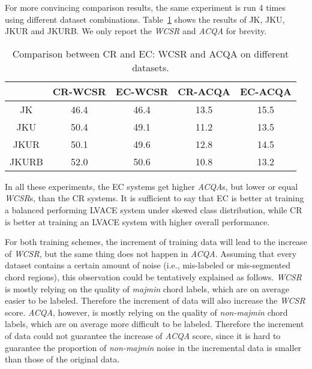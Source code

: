 For more convincing comparison results, the same experiment is run 4 times using different dataset combinations. Table~\ref{tab:4-datasize-ns} shows the results of JK, JKU, JKUR and JKURB. We only report the \textit{WCSR} and \textit{ACQA} for brevity.
\begin{table}[htb]
	\caption{Comparison between CR and EC: WCSR and ACQA on different datasets.}
	\centering
	\scriptsize
	\begin{tabular}{|c|c|c|c|c|} \hline
		& CR-WCSR & EC-WCSR & CR-ACQA & EC-ACQA \\ \hline
		JK & 46.4 & 46.4 & 13.5 & 15.5 \\ \hline
		JKU & 50.4 & 49.1 & 11.2 & 13.5 \\ \hline
		JKUR & 50.1 & 49.6 & 12.8 & 14.5 \\ \hline
		JKURB & 52.0 & 50.6 & 10.8 & 13.2 \\ \hline
	\end{tabular}
	\label{tab:4-datasize-ns}
\end{table}

In all these experiments, the EC systems get higher \textit{ACQA}s, but lower or equal \textit{WCSR}s, than the CR systems. It is sufficient to say that EC is better at training a balanced performing LVACE system under skewed class distribution, while CR is better at training an LVACE system with higher overall performance.

For both training schemes, the increment of training data will lead to the increase of \textit{WCSR}, but the same thing does not happen in \textit{ACQA}. Assuming that every dataset contains a certain amount of noise (i.e., mis-labeled or mis-segmented chord regions), this observation could be tentatively explained as follows. \textit{WCSR} is mostly relying on the quality of \textit{majmin} chord labels, which are on average easier to be labeled. Therefore the increment of data will also increase the \textit{WCSR} score. \textit{ACQA}, however, is mostly relying on the quality of \textit{non-majmin} chord labels, which are on average more difficult to be labeled. Therefore the increment of data could not guarantee the increase of \textit{ACQA} score, since it is hard to guarantee the proportion of \textit{non-majmin} noise in the incremental data is smaller than those of the original data.

